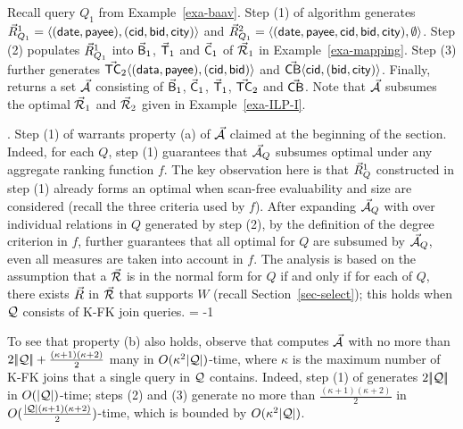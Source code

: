 \begin{example}\label{exa-usc}
Recall query $Q_{1}$ from Example~\ref{exa-baav}.
Step (1) of algorithm \usc generates $\vec{R}_{Q_{1}}^{1} \allowbreak =\allowbreak
\langle (\protect\mathsf{date}, \allowbreak \protect\mathsf{payee}),\allowbreak (\protect\mathsf{cid}, \allowbreak \protect\mathsf{bid},
  \allowbreak \protect\mathsf{city})\rangle$ and 
$\vec{R}_{Q_{1}}^{2} = \langle (\protect\mathsf{date}, \allowbreak \protect\mathsf{payee},
  \protect\mathsf{cid}, \allowbreak \protect\mathsf{bid}, \allowbreak \protect\mathsf{city}),\allowbreak \emptyset\rangle$. 
Step (2) %
populates $\vec{R}_{Q_{1}}^{1}$ into 
$\vec{\protect\mathsf{B}}_{1}$, $\vec{\protect\mathsf{T}}_{1}$ and $\vec{\protect\mathsf{C}}_{1}$ of
$\vec{{\mathcal R}}_{1}$ in Example~\ref{exa-mapping}.
Step (3) further generates $\vec{\protect\mathsf{TC}}_{2}\langle (\protect\mathsf{data},\allowbreak
  \protect\mathsf{payee}),\allowbreak (\protect\mathsf{cid},\allowbreak \protect\mathsf{bid})\rangle$ and 
$\vec{\protect\mathsf{CB}}\langle \protect\mathsf{cid},\allowbreak (\protect\mathsf{bid},\allowbreak \protect\mathsf{city})\rangle$.
Finally, \opts returns a set $\vec{{\mathcal A}}$ consisting of 
$\vec{\protect\mathsf{B}}_{1}$, $\vec{\protect\mathsf{C}}_{1}$, $\vec{\protect\mathsf{T}}_{1}$,
$\vec{\protect\mathsf{TC}}_{2}$ and $\vec{\protect\mathsf{CB}}$.
Note that $\vec{{\mathcal A}}$ subsumes the optimal \bds $\vec{{\mathcal R}}_{1}$ and
$\vec{{\mathcal R}}_{2}$ given in Example~\ref{exa-ILP-I}.
\end{example}

\vspace{-0.7ex}


.
Step (1) of \usc warrants property (a) of $\vec{{\mathcal A}}$ claimed at
the beginning of the section. Indeed, for each $Q$, step (1)
guarantees that $\vec{{\mathcal A}}_{Q}$ subsumes optimal \bdss under
any aggregate ranking function $f$.
The key observation
here is that $\vec{R}_{Q}^{1}$ constructed in step (1) already forms an
optimal \bds when scan-free evaluability and size are considered
(recall the three criteria used by $f$).
After expanding $\vec{{\mathcal A}}_{Q}$ with \bss over individual relations
in $Q$ generated by step (2), by the definition of the degree
criterion in $f$, \usc further guarantees that all optimal \bdss for $Q$ are subsumed by
$\vec{{\mathcal A}}_{Q}$, even all measures are taken into account in $f$.
The analysis is based on the assumption that a \bds $\vec{{\mathcal R}}$ is
in the normal form for $Q$ if and only if for each \qcs of $Q$, there
exists \bs $\vec{R}$ in $\vec{{\mathcal R}}$ that supports $W$ (recall
Section~\ref{sec-select}); this holds when $\mathcal Q$
consists of K-FK join \SPC queries.
\looseness = -1



\vspace{0.36ex}

To see that property (b) also holds,
observe that \usc computes $\vec{{\mathcal A}}$ with
no more than $2|\!|{\mathcal Q}|\!| + \frac{(\kappa+1)(\kappa+2)}{2}$
many \bss in $O(\kappa^{2}|{\mathcal Q}|)$-time, where $\kappa$ is the
maximum number of K-FK joins that a single query in $\mathcal Q$
contains. Indeed, step (1) of \usc generates $2|\!|{\mathcal Q}|\!|$ \bss in
$O(|{\mathcal Q}|)$-time; steps (2) and (3) generate no more than
$\frac{(\kappa+1)(\kappa+2)}{2}$ \bss in
$O(\frac{|{\mathcal Q}|(\kappa+1)(\kappa+2)}{2})$-time, which is bounded
by $O(\kappa^{2}|{\mathcal Q}|)$.

